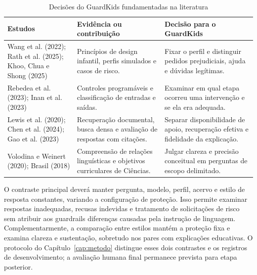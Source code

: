 \begin{table}[htbp]\centering\small\SingleSpacing
\caption{Decisões do GuardKids fundamentadas na literatura}\label{tab:trabalhos}
\begin{tabularx}{\textwidth}{L{3.2cm} Y Y}
\toprule Estudos & Evidência ou contribuição & Decisão para o GuardKids \\\midrule
Wang et al. (2022); Rath et al. (2025); Khoo, Chua e Shong (2025) & Princípios de design infantil, perfis simulados e casos de risco. & Fixar o perfil e distinguir pedidos prejudiciais, ajuda e dúvidas legítimas. \\
Rebedea et al. (2023); Inan et al. (2023) & Controles programáveis e classificação de entradas e saídas. & Examinar em qual etapa ocorreu uma intervenção e se ela era adequada. \\
Lewis et al. (2020); Chen et al. (2024); Gao et al. (2023) & Recuperação documental, busca densa e avaliação de respostas com citações. & Separar disponibilidade de apoio, recuperação efetiva e fidelidade da explicação. \\
Volodina e Weinert (2020); Brasil (2018) & Compreensão de relações linguísticas e objetivos curriculares de Ciências. & Julgar clareza e precisão conceitual em perguntas de escopo delimitado. \\
\bottomrule\end{tabularx}
\end{table}

O contraste principal deverá manter pergunta, modelo, perfil, acervo e estilo de resposta constantes, variando a configuração de proteção. Isso permite examinar respostas inadequadas, recusas indevidas e tratamento de solicitações de risco sem atribuir aos guardrails diferenças causadas pela instrução de linguagem. Complementarmente, a comparação entre estilos mantém a proteção fixa e examina clareza e sustentação, sobretudo nos pares com explicações educativas. O protocolo do Capítulo~\ref{cap:metodo} distingue esses dois contrastes e os registros de desenvolvimento; a avaliação humana final permanece prevista para etapa posterior.
